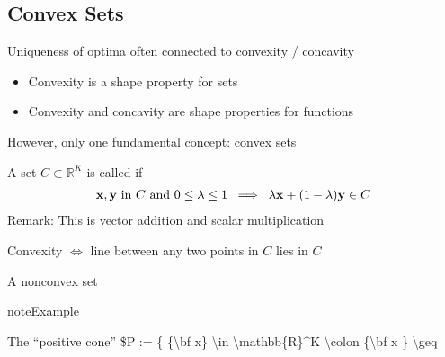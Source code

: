 \documentclass[letterpaper,10pt,english]{jupyterBook}
\begin{document}
\subsection{Convex Sets}
\label{\detokenize{06.optimization_fundamentals:id4}}
\sphinxAtStartPar
Uniqueness of optima often connected to convexity / concavity
\begin{itemize}
\item {} 
\sphinxAtStartPar
Convexity is a shape property for sets

\item {} 
\sphinxAtStartPar
Convexity and concavity are shape properties for functions

\end{itemize}

\sphinxAtStartPar
However, only one fundamental concept: convex sets

\sphinxAtStartPar
A set \(C \subset \mathbb{R}^K\) is called  if
\begin{equation*}
\begin{split}
%
{\bf x}, {\bf y} \text{ in } C \text{ and } 0 \leq \lambda \leq 1
\; \implies \;
\lambda {\bf x} + (1 - \lambda) {\bf y} \in C
%
\end{split}
\end{equation*}
\sphinxAtStartPar
Remark: This is vector addition and scalar multiplication

\sphinxAtStartPar
Convexity \(\iff\) line between any two points in \(C\) lies in \(C\)

\begin{figure}[htbp]
\centering

\noindent{}
\end{figure}

\sphinxAtStartPar
A non\sphinxhyphen{}convex set

\begin{figure}[htbp]
\centering

\noindent{}
\end{figure}

\begin{sphinxadmonition}{note}{Example}

\sphinxAtStartPar
The “positive cone” \$P := \{ \{\textbackslash{}bf x\} \textbackslash{}in \textbackslash{}mathbb\{R\}\textasciicircum{}K \textbackslash{}colon \{\textbackslash{}bf x \} \textbackslash{}geq
\end{sphinxadmonition}
\end{document}
